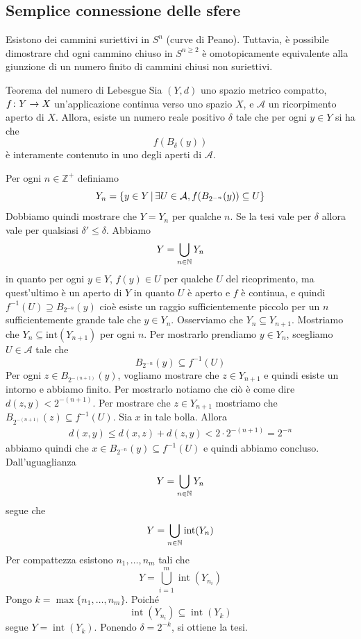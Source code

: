 \documentclass[a4paper]{article}
\begin{document}
\subsection{Semplice connessione delle sfere}

Esistono dei cammini suriettivi in \(S^n\) (curve di Peano).
Tuttavia, è possibile dimostrare chd ogni cammino chiuso in \(S^{n \geq 2}\) è omotopicamente
equivalente alla giunzione
di un numero finito di cammini chiusi non suriettivi.

\begin{snippetproposition}{Teorema del numero di Lebesgue}
    Sia \((Y, d)\) uno spazio metrico compatto,
    \(f \colon Y \to X\) un'applicazione continua verso uno spazio \(X\),
    e \(\mathcal{A}\) un ricorpimento aperto di \(X\).
    Allora, esiste un numero reale positivo
    \(\delta\) tale che per ogni \(y \in Y\) si ha che
    \[
        f(B_\delta(y))
    \]
    è interamente contenuto in uno degli aperti di \(\mathcal{A}\).
\end{snippetproposition}

\begin{snippetproof}{}
    Per ogni \(n \in \mathbb{Z}^{+}\) definiamo
    \[
        Y_n = \{y\in Y \,|\, \exists U \in \mathcal A, f(B_{2^{-n}}(y)) \subseteq U\}
    \]
    Dobbiamo quindi mostrare che \(Y = Y_n\) per qualche \(n\).
    Se la tesi vale per \(\delta\) allora vale per qualsiasi \(\delta' \leq \delta\).
    Abbiamo
    \[
        Y = \bigcup_{n \in \mathbb{N}} Y_n
    \]
    in quanto per ogni \(y \in Y\), \(f(y) \in U\) per qualche \(U\) del ricoprimento,
    ma quest'ultimo è un aperto di \(Y\) in quanto \(U\) è aperto e \(f\) è continua,
    e quindi \(f^{-1}(U) \supseteq B_{2^{-n}}(y)\)
    cioè esiste un raggio sufficientemente piccolo per un \(n\) sufficientemente grande
    tale che \(y \in Y_n\).
    Osserviamo che \(Y_n \subseteq Y_{n+1}\).
    Mostriamo che \(Y_n \subseteq \text{int}(Y_{n+1})\) per ogni \(n\).
    Per mostrarlo prendiamo \(y \in Y_n\), scegliamo \(U \in \mathcal{A}\) tale che
    \[
        B_{2^{-n}}(y) \subseteq f^{-1}(U) 
    \]
    Per ogni \(z \in B_{2^{-(n+1)}}(y)\), vogliamo mostrare che \(z \in Y_{n+1}\)
    e quindi esiste un intorno e abbiamo finito.
    Per mostrarlo notiamo che ciò è come dire \(d(z, y) < 2^{-(n+1)}\).
    Per mostrare che \(z \in Y_{n+1}\)
    mostriamo che \(B_{2^{-(n+1)}}(z) \subseteq f^{-1}(U)\).
    Sia \(x\) in tale bolla.
    Allora
    \begin{align*}
        d(x,y) \leq d(x,z) + d(z,y) < 2 \cdot 2^{-(n+1)} = 2^{-n}
    \end{align*}
    abbiamo quindi che \(x \in B_{2^{-n}}(y) \subseteq f^{-1}(U)\) e quindi abbiamo concluso.
    Dall'uguaglianza
    \[
        Y = \bigcup_{n \in \mathbb{N}} Y_n
    \]
    segue che
    \[
        Y = \bigcup_{n \in \mathbb{N}} \text{int}(Y_n)
    \]
    Per compattezza esistono \(n_1,\dots,n_m\) tali che
    \[Y = \bigcup_{i=1}^m \operatorname{int}(Y_{n_i})\]
    Pongo \(k=\max\{n_1,\dots,n_m\}\).
    Poiché \[\operatorname{int}(Y_{n_i})\subseteq \operatorname{int}(Y_k)\]
    segue \(Y=\operatorname{int}(Y_k)\).
    Ponendo \(\delta = 2^{-k}\), si ottiene la tesi.
\end{snippetproof}
\end{document}
